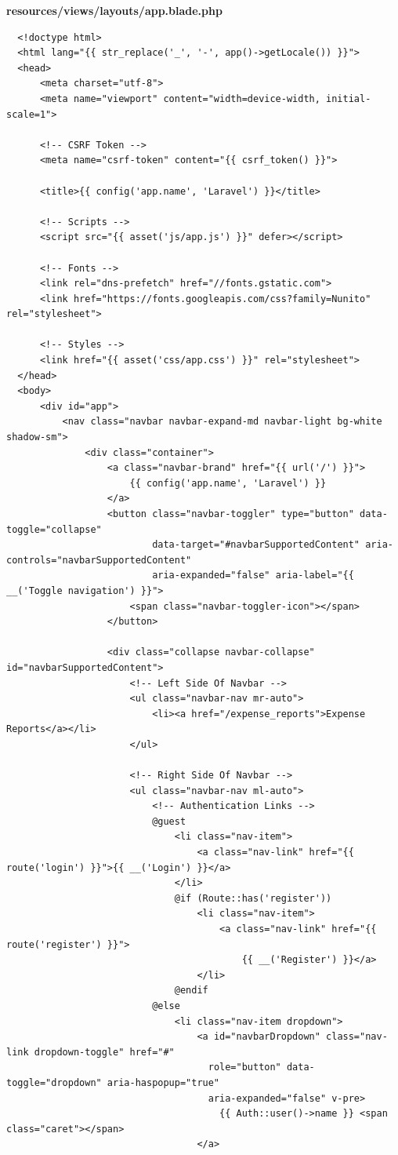 \documentclass{article}
\begin{document}
\textbf{resources/views/layouts/app.blade.php}
\begin{verbatim}
  <!doctype html>
  <html lang="{{ str_replace('_', '-', app()->getLocale()) }}">
  <head>
      <meta charset="utf-8">
      <meta name="viewport" content="width=device-width, initial-scale=1">

      <!-- CSRF Token -->
      <meta name="csrf-token" content="{{ csrf_token() }}">

      <title>{{ config('app.name', 'Laravel') }}</title>

      <!-- Scripts -->
      <script src="{{ asset('js/app.js') }}" defer></script>

      <!-- Fonts -->
      <link rel="dns-prefetch" href="//fonts.gstatic.com">
      <link href="https://fonts.googleapis.com/css?family=Nunito" rel="stylesheet">

      <!-- Styles -->
      <link href="{{ asset('css/app.css') }}" rel="stylesheet">
  </head>
  <body>
      <div id="app">
          <nav class="navbar navbar-expand-md navbar-light bg-white shadow-sm">
              <div class="container">
                  <a class="navbar-brand" href="{{ url('/') }}">
                      {{ config('app.name', 'Laravel') }}
                  </a>
                  <button class="navbar-toggler" type="button" data-toggle="collapse"
                          data-target="#navbarSupportedContent" aria-controls="navbarSupportedContent"
                          aria-expanded="false" aria-label="{{ __('Toggle navigation') }}">
                      <span class="navbar-toggler-icon"></span>
                  </button>

                  <div class="collapse navbar-collapse" id="navbarSupportedContent">
                      <!-- Left Side Of Navbar -->
                      <ul class="navbar-nav mr-auto">
                          <li><a href="/expense_reports">Expense Reports</a></li>
                      </ul>

                      <!-- Right Side Of Navbar -->
                      <ul class="navbar-nav ml-auto">
                          <!-- Authentication Links -->
                          @guest
                              <li class="nav-item">
                                  <a class="nav-link" href="{{ route('login') }}">{{ __('Login') }}</a>
                              </li>
                              @if (Route::has('register'))
                                  <li class="nav-item">
                                      <a class="nav-link" href="{{ route('register') }}">
                                          {{ __('Register') }}</a>
                                  </li>
                              @endif
                          @else
                              <li class="nav-item dropdown">
                                  <a id="navbarDropdown" class="nav-link dropdown-toggle" href="#"
                                    role="button" data-toggle="dropdown" aria-haspopup="true"
                                    aria-expanded="false" v-pre>
                                      {{ Auth::user()->name }} <span class="caret"></span>
                                  </a>


\end{verbatim}
\end{document}
